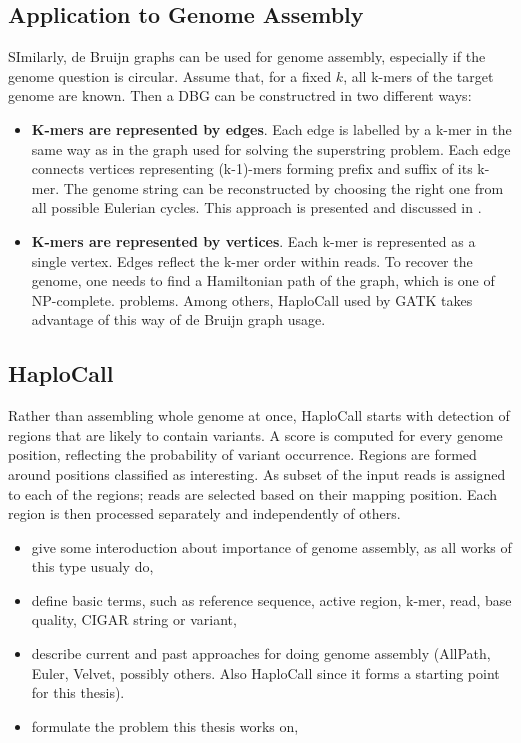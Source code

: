 \subsection{Application to Genome Assembly}
\label{subsec:dbg-application-to-genome-assembly}

SImilarly, de Bruijn graphs can be used for genome assembly, especially if the genome question is circular. Assume that, for a fixed $k$, all k-mers of the target genome are known. Then a DBG can be constructred in two different ways:
\begin{itemize}
\item \textbf{K-mers are represented by edges}. Each edge is labelled by a k-mer in the same way as in the graph used for solving the superstring problem. Each edge connects vertices representing (k-1)-mers forming prefix and suffix of its k-mer. The genome string can be reconstructed by choosing the right one from all possible Eulerian cycles. This approach is presented and discussed in \cite{dbg-apply}.
\item \textbf{K-mers are represented by vertices}. Each k-mer is represented as a single vertex. Edges reflect the k-mer order within reads. To recover the genome, one needs to find a Hamiltonian path of the graph, which is one of NP-complete. problems. Among others, HaploCall \cite{haplocall} used by GATK takes advantage of this way of de Bruijn graph usage.
\end{itemize}

\subsection{HaploCall}

Rather than assembling whole genome at once, HaploCall starts with detection of regions that are likely to contain variants. A score is computed for every genome position, reflecting the probability of variant occurrence. Regions are formed around positions classified as interesting. As subset of the input reads is assigned to each of the regions; reads are selected based on their mapping position. Each region is then processed separately and independently of others.

\begin{itemize}
\item give some interoduction about importance of genome assembly, as all works of this type usualy do,
\item define basic terms, such as reference sequence, active region, k-mer, read, base quality, CIGAR string or variant,
\item describe current and past approaches for doing genome assembly (AllPath, Euler, Velvet, possibly others. Also HaploCall since it forms a starting point for this thesis). 
\item formulate the problem this thesis works on,
\end{itemize}
